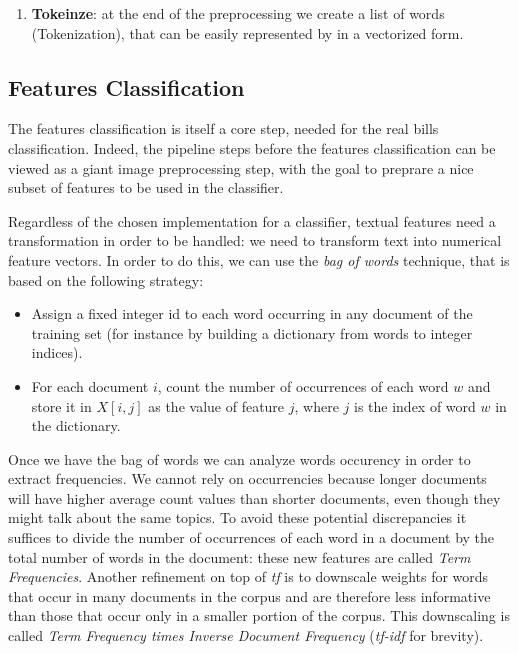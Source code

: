 \documentclass[10pt,twocolumn,letterpaper]{article}
\begin{document}
\begin{enumerate}
    the process of grouping together the inflected forms of a word so
    they can be analysed as a single item, identified by the word's
    lemma, or dictionary form.\footnote{\href{
        https://en.wikipedia.org/wiki/Lemmatisation}{
        https://en.wikipedia.org/wiki/Lemmatisation}}. With
    this step, indeed, we tried to group words together in order to
    simplify the classification phase. However, we noticed that this
    step do not improve the performance and it can also produce worst
    results as it tries to group wrong words retrieved from the OCR.
  \item \textbf{Tokeinze}: at the end of the preprocessing we create a list of
    words (Tokenization), that can be easily represented by in a
    vectorized form.
\end{enumerate}

\subsection{Features Classification}
\label{subsec:classification}

The features classification is itself a core step, needed for the real
bills classification. Indeed, the pipeline steps before the features
classification can be viewed as a giant image preprocessing step, with
the goal to preprare a nice subset of features to be used in the
classifier.

Regardless of the chosen implementation for a classifier, textual
features need a transformation in order to be handled: we need to
transform text into numerical feature vectors. In order to do this, we
can use the \emph{bag of words} technique, that is based on the
following strategy:

\begin{itemize}
  \item Assign a fixed integer id to each word occurring in any
    document of the training set (for instance by building a
    dictionary from words to integer indices).
  \item For each document $i$, count the number of occurrences of each
    word $w$ and store it in $X[i, j]$ as the value of feature $j$,
    where $j$ is the index of word $w$ in the dictionary.
\end{itemize}

Once we have the bag of words we can analyze words occurency in order
to extract frequencies. We cannot rely on occurrencies because longer
documents will have higher average count values than shorter
documents, even though they might talk about the same topics. To avoid
these potential discrepancies it suffices to divide the number of
occurrences of each word in a document by the total number of words in
the document: these new features are called \emph{Term
  Frequencies}. Another refinement on top of \emph{tf} is to downscale
weights for words that occur in many documents in the corpus and are
therefore less informative than those that occur only in a smaller
portion of the corpus. This downscaling is called \emph{Term Frequency
  times Inverse Document Frequency} (\emph{tf-idf} for brevity).
\end{document}
